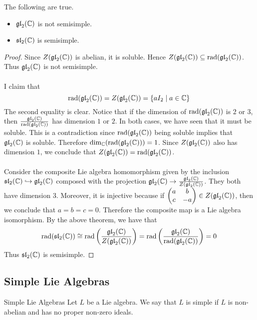 \documentclass[a4paper]{article}
\begin{document}
\begin{eg}{}{} The following are true. 
\begin{itemize}
\item $\mathfrak{gl}_2(\mathbb{C})$ is not semisimple. 
\item $\mathfrak{sl}_2(\mathbb{C})$ is semisimple. 
\end{itemize} \tcbline
\begin{proof}
Since $Z(\mathfrak{gl}_2(\mathbb{C}))$ is abelian, it is soluble. Hence $Z(\mathfrak{gl}_2(\mathbb{C}))\subseteq\text{rad}(\mathfrak{gl}_2(\mathbb{C}))$. Thus $\mathfrak{gl}_2(\mathbb{C})$ is not semisimple. \\~\\

I claim that $$\text{rad}(\mathfrak{gl}_2(\mathbb{C}))=Z(\mathfrak{gl}_2(\mathbb{C}))=\{aI_2\;|\;a\in\mathbb{C}\}$$ The second equality is clear. Notice that if the dimension of $\text{rad}(\mathfrak{gl}_2(\mathbb{C}))$ is $2$ or $3$, then $\frac{\mathfrak{gl}_2(\mathbb{C})}{\text{rad}(\mathfrak{gl}_2(\mathbb{C}))}$ has dimension $1$ or $2$. In both cases, we have seen that it must be soluble. This is a contradiction since $\text{rad}(\mathfrak{gl}_2(\mathbb{C}))$ being soluble implies that $\mathfrak{gl}_2(\mathbb{C})$ is soluble. Therefore $\dim_{\mathbb{C}}(\text{rad}(\mathfrak{gl}_2(\mathbb{C})))=1$. Since $Z(\mathfrak{gl}_2(\mathbb{C}))$ also has dimension $1$, we conclude that $Z(\mathfrak{gl}_2(\mathbb{C}))=\text{rad}(\mathfrak{gl}_2(\mathbb{C}))$. \\~\\

Consider the composite Lie algebra homomorphism given by the inclusion $\mathfrak{sl}_2(\mathbb{C})\hookrightarrow\mathfrak{gl}_2(\mathbb{C})$ composed with the projection $\mathfrak{gl}_2(\mathbb{C})\to\frac{\mathfrak{gl}_2(\mathbb{C})}{Z(\mathfrak{gl}_2(\mathbb{C}))}$. They both have dimension $3$. Moreover, it is injective because if $\begin{pmatrix}
a & b\\
c & -a
\end{pmatrix}\in Z(\mathfrak{gl}_2(\mathbb{C}))$, then we conclude that $a=b=c=0$. Therefore the composite map is a Lie algebra isomorphism. By the above theorem, we have that $$\text{rad}(\mathfrak{sl}_2(\mathbb{C}))\cong\text{rad}\left(\frac{\mathfrak{gl}_2(\mathbb{C})}{Z(\mathfrak{gl}_2(\mathbb{C}))}\right)=\text{rad}\left(\frac{\mathfrak{gl}_2(\mathbb{C})}{\text{rad}(\mathfrak{gl}_2(\mathbb{C}))}\right)=0$$ Thus $\mathfrak{sl}_2(\mathbb{C})$ is semisimple. 
\end{proof}
\end{eg}

\subsection{Simple Lie Algebras}
\begin{defn}{Simple Lie Algebras}{} Let $L$ be a Lie algebra. We say that $L$ is simple if $L$ is non-abelian and has no proper non-zero ideals. 
\end{defn}
\end{document}
